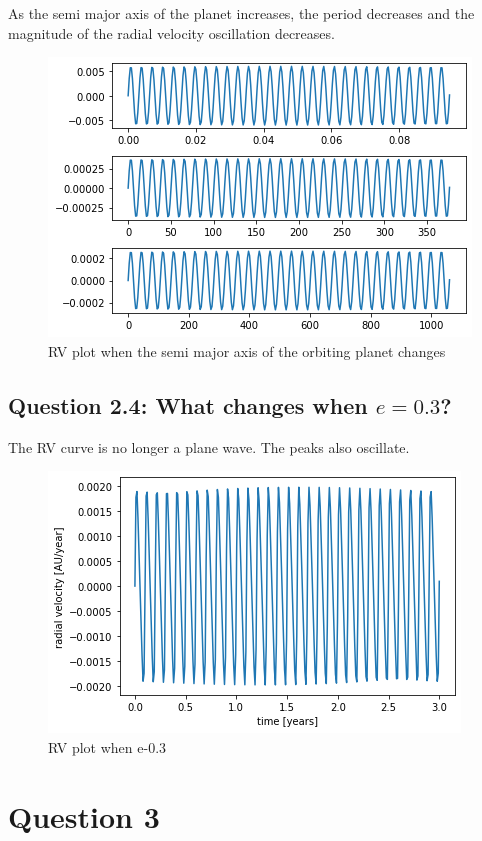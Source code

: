 \documentclass{article}
\begin{document}
\\\\
As the semi major axis of the planet increases, the period decreases and the magnitude of the radial velocity oscillation decreases. 
\begin{figure}[h!]
\begin{center}
    \includegraphics[scale=0.4]{semi_major_axis.png}
    \end{center}
  \caption{RV plot when the semi major axis of the orbiting planet changes}
\end{figure}
\subsection{Question 2.4: What changes when $e=0.3$?}
\newpage
The RV curve is no longer a plane wave. The peaks also oscillate.
\begin{figure}[!h]
    \begin{center}
    \includegraphics[scale=0.5]{e_0.3.png}
    \end{center}
  \caption{RV plot when e-0.3}
\end{figure}
\newpage
\newpage
\section{Question 3}
\end{document}
